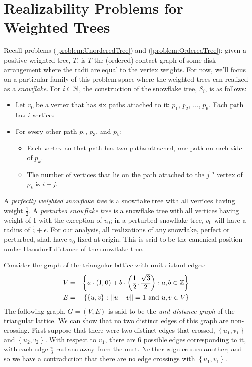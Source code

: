 \section{Realizability Problems for Weighted Trees}
Recall problems (\ref{problem:UnorderedTree}) and (\ref{problem:OrderedTree}): given a positive weighted tree, $T$, is $T$ the (ordered) contact graph of some disk arrangement where the radii are equal to the vertex weights.  For now, we'll focus on a particular family of this problem space where the weighted trees can realized as a \textit{snowflake}. For $i \in {\mathbb{N}}$, the construction of the snowflake tree, $S_i$, is as follows:
\begin{itemize}
\item Let $v_0$ be a vertex that has six paths attached to it: $p_1$, $p_2$, $\dots$, $p_6$.  Each path has $i$ vertices.
\item For every other path $p_1$, $p_3$, and $p_5$: 
	\begin{itemize}
		\item 	Each vertex on that path has two paths attached, one path on each side of $p_k$.
		\item	The number of vertices that lie on the path attached to the $j^\text{th}$ vertex of $p_k$ is $i-j$.
	\end{itemize}
\end{itemize}
A \textit{perfectly weighted snowflake tree} is a snowflake tree with all vertices having weight $\frac{1}{2}$.  A \textit{perturbed snowflake tree} is a snowflake tree with all vertices having weight of 1 with the exception of $v_0$;  in a perturbed snowflake tree, $v_0$ will have a radius of $\frac{1}{2} + \epsilon$.  For our analysis, all realizations of any snowflake, perfect or perturbed, shall have $v_0$ fixed at origin.  This is said to be the canonical position under Hausdorff distance of the snowflake tree.   

Consider the graph of the triangular lattice with unit distant edges:
\begin{eqnarray*}
V &=& \left\lbrace a\cdot (1,0) + b \cdot \left(\frac{1}{2},\frac{\sqrt{3}}{2}\right) : a,b \in {\mathbb{Z}} \right\rbrace\\
E &=& \left\lbrace \left\lbrace u,v \right\rbrace : \vert\vert u-v \vert\vert = 1 \text{ and } u,v \in V\right\rbrace
\end{eqnarray*}
The following graph, $G=(V,E)$ is said to be the \textit{unit distance graph} of the triangular lattice.  We can show that no two distinct edges of this graph are non-crossing.  First suppose that there were two distinct edges that crossed, $\left\lbrace u_1,v_1 \right\rbrace $ and $\left\lbrace u_2,v_2 \right\rbrace$.  With respect to $u_1$, there are 6 possible edges corresponding to it, with each edge $\frac{\pi}{3}$ radians away from the next.  Neither edge crosses another; and so we have a contradiction that there are no edge crossings with $\left\lbrace u_1,v_1 \right\rbrace $.  


